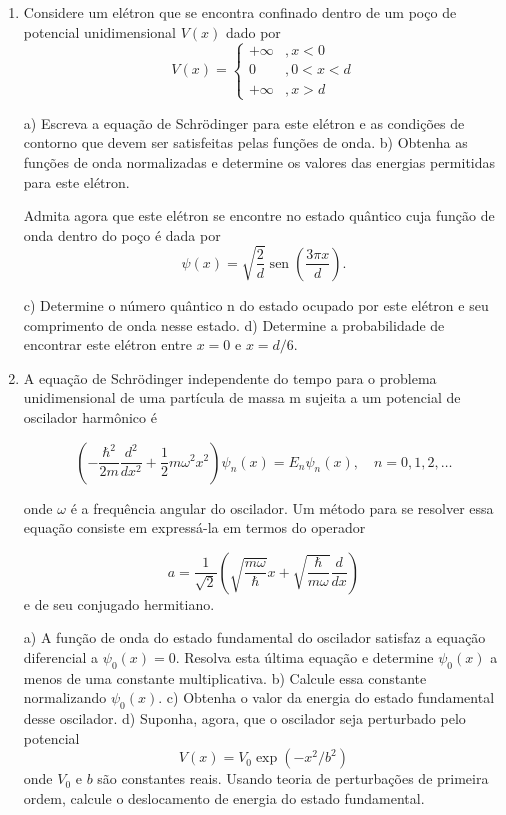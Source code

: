 \begin{enumerate}[start=1,label={\bfseries Q\arabic*.}]
\item Considere um elétron que se encontra confinado dentro de um poço de potencial unidimensional $V(x)$ dado por
$$
V(x)=\left\{\begin{array}{cc}
+\infty & , x<0 \\
0 & , 0<x<d \\
+\infty & , x>d
\end{array}\right.
$$

a) Escreva a equação de Schrödinger para este elétron e as condições de contorno que devem ser satisfeitas pelas funções de onda.
b) Obtenha as funções de onda normalizadas e determine os valores das energias permitidas para este elétron.

Admita agora que este elétron se encontre no estado quântico cuja função de onda dentro do poço é dada por
$$
\psi(x)=\sqrt{\frac{2}{d}} \operatorname{sen}\left(\frac{3 \pi x}{d}\right).
$$

c) Determine o número quântico n do estado ocupado por este elétron e seu comprimento de onda nesse estado.
d) Determine a probabilidade de encontrar este elétron entre $x = 0$ e $x = d/6$.



\item A equação de Schrödinger independente do tempo para o problema unidimensional de uma partícula de massa m sujeita a um potencial de oscilador harmônico é

$$
\left(-\frac{\hbar^{2}}{2 m} \frac{d^{2}}{d x^{2}}+\frac{1}{2} m \omega^{2} x^{2}\right) \psi_{n}(x)=E_{n} \psi_{n}(x), \quad n=0,1,2, \ldots
$$

onde $\omega$ é a frequência angular do oscilador. Um método para se resolver essa equação consiste em expressá-la em termos do operador

$$
a=\frac{1}{\sqrt{2}}\left(\sqrt{\frac{m \omega}{\hbar}} x+\sqrt{\frac{\hbar}{m \omega}} \frac{d}{d x}\right)
$$
e de seu conjugado hermitiano.

a) A função de onda do estado fundamental do oscilador satisfaz a equação diferencial a $\psi_{0}(x ) = 0$. Resolva esta última equação e determine $\psi_{0}(x)$ a menos de uma
constante multiplicativa.
b) Calcule essa constante normalizando $\psi_{0}(x)$.
c) Obtenha o valor da energia do estado fundamental desse oscilador.
d) Suponha, agora, que o oscilador seja perturbado pelo potencial
$$
V(x)=V_{0} \exp \left(-x^{2} / b^{2}\right)
$$
onde $V_{0}$ e $b$ são constantes reais. Usando teoria de perturbações de primeira ordem, calcule o deslocamento de energia do estado fundamental.




\end{enumerate}
